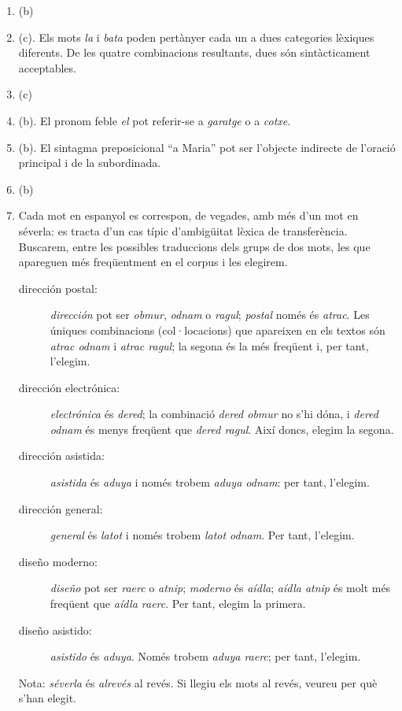 \begin{enumerate}
\item (b)
\item (c). Els mots \emph{la} i \emph{bata} poden pertànyer cada un a
  dues categories lèxiques diferents. De les quatre combinacions
  resultants, dues són sintàcticament acceptables.
\item (c)
\item (b). El pronom feble \emph{el} pot referir-se a \emph{garatge} o
  a \emph{cotxe}.
\item (b). El sintagma preposicional ``a Maria'' pot ser l'objecte
  indirecte de l'oració principal i de la subordinada.
\item (b)
\item Cada mot en espanyol es correspon, de vegades, amb més d'un mot
  en séverla: es tracta d'un cas típic d'ambigüitat lèxica de
  transferència. Buscarem, entre les possibles traduccions dels grups
  de dos mots, les que apareguen més freqüentment en el corpus i les
  elegirem.
  \begin{description}
  \item[dirección postal:] \emph{dirección} pot ser \emph{obmur},
    \emph{odnam} o \emph{ragul}; \emph{postal} només és
    \emph{atrac}. Les úniques combinacions (col·locacions) que
    apareixen en els textos són \emph{atrac odnam} i \emph{atrac
      ragul}; la segona és la més freqüent i, per tant, l'elegim.
  \item[dirección electrónica:] \emph{electrónica} és \emph{dered}; la
    combinació \emph{dered obmur} no s'hi dóna, i \emph{dered odnam}
    és menys freqüent que \emph{dered ragul}. Així doncs, elegim la
    segona.
  \item[dirección asistida:] \emph{asistida} és \emph{aduya} i només
    trobem \emph{aduya odnam}: per tant, l'elegim.
  \item[dirección general:] \emph{general} és \emph{latot} i només
    trobem \emph{latot odnam}. Per tant, l'elegim.
  \item[diseño moderno:] \emph{diseño} pot ser \emph{raerc} o
    \emph{atnip}; \emph{moderno} és \emph{aídla}; \emph{aídla atnip}
    és molt més freqüent que \emph{aídla raerc}. Per tant, elegim la
    primera.
  \item[diseño asistido:] \emph{asistido} és \emph{aduya}. Només
    trobem \emph{aduya raerc}; per tant, l'elegim.
  \end{description}
  Nota: \emph{séverla} és \emph{alrevés} al revés. Si llegiu els mots
  al revés, veureu per què s'han elegit.


\end{enumerate}
